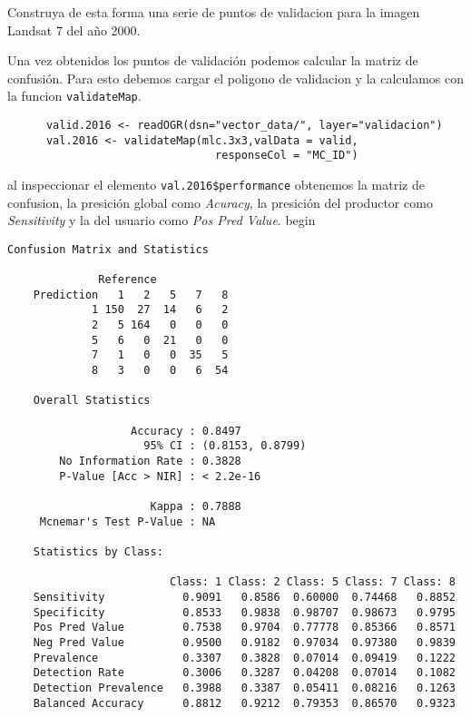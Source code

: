 \begin{act}
  Construya de esta forma una serie de puntos de validacion para la imagen Landsat
  7 del a\~no 2000.
\end{act}

\begin{exa}

  Una vez obtenidos los puntos de validaci\'on podemos calcular la matriz de confusi\'on.
  Para esto debemos cargar el poligono de validacion y la calculamos con la
  funcion \texttt{validateMap}.

  \begin{lstlisting}
      valid.2016 <- readOGR(dsn="vector_data/", layer="validacion")
      val.2016 <- validateMap(mlc.3x3,valData = valid,
                                responseCol = "MC_ID")
  \end{lstlisting}

  al inspeccionar el elemento \verb|val.2016$performance| obtenemos la matriz
  de confusion, la presici\'on global como \emph{Acuracy}, la presici\'on del
  productor como \emph{Sensitivity} y la del usuario como \emph{Pos Pred Value}.
  begin

  \begin{Verbatim}[fontsize=\small]
    Confusion Matrix and Statistics

              Reference
    Prediction   1   2   5   7   8
             1 150  27  14   6   2
             2   5 164   0   0   0
             5   6   0  21   0   0
             7   1   0   0  35   5
             8   3   0   0   6  54

    Overall Statistics

                   Accuracy : 0.8497
                     95% CI : (0.8153, 0.8799)
        No Information Rate : 0.3828
        P-Value [Acc > NIR] : < 2.2e-16

                      Kappa : 0.7888
     Mcnemar's Test P-Value : NA

    Statistics by Class:

                         Class: 1 Class: 2 Class: 5 Class: 7 Class: 8
    Sensitivity            0.9091   0.8586  0.60000  0.74468   0.8852
    Specificity            0.8533   0.9838  0.98707  0.98673   0.9795
    Pos Pred Value         0.7538   0.9704  0.77778  0.85366   0.8571
    Neg Pred Value         0.9500   0.9182  0.97034  0.97380   0.9839
    Prevalence             0.3307   0.3828  0.07014  0.09419   0.1222
    Detection Rate         0.3006   0.3287  0.04208  0.07014   0.1082
    Detection Prevalence   0.3988   0.3387  0.05411  0.08216   0.1263
    Balanced Accuracy      0.8812   0.9212  0.79353  0.86570   0.9323
  \end{Verbatim}


\end{exa}
